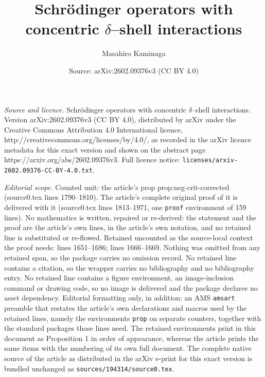 \documentclass[10pt,a4paper]{amsart}
\title{Schr\"odinger operators with concentric $\delta$--shell interactions}
\author{Masahiro Kaminaga}
\date{Source: arXiv:2602.09376v3 (CC BY 4.0)}
\begin{document}
\maketitle

\noindent\emph{Source and licence.} Schr\"odinger operators with concentric $\delta$--shell interactions. Version arXiv:2602.09376v3 (CC BY 4.0), distributed by arXiv under the Creative Commons Attribution 4.0 International licence, http://creativecommons.org/licenses/by/4.0/, as recorded in the arXiv licence metadata for this exact version and shown on the abstract page https://arxiv.org/abs/2602.09376v3. Full licence notice: \texttt{licenses/arxiv-2602.09376-CC-BY-4.0.txt}.\par\smallskip

\noindent\textit{Editorial scope.} Counted unit: the article's prop prop:neg-crit-corrected (source0.tex lines 1790--1810). The article's complete original proof of it is delivered with it (source0.tex lines 1813--1971, one \texttt{proof} environment of 159 lines). No mathematics is written, repaired or re-derived: the statement and the proof are the article's own lines, in the article's own notation, and no retained line is substituted or re-flowed.  Retained uncounted as the source-local context the proof needs: lines 1651--1686; lines 1666--1669.  Nothing was omitted from any retained span, so the package carries no omission record.  No retained line contains a citation, so the wrapper carries no bibliography and no bibliography entry.  No retained line contains a figure environment, an image-inclusion command or drawing code, so no image is delivered and the package declares no asset dependency.  Editorial formatting only, in addition: an AMS \texttt{amsart} preamble that restates the article's own declarations and macros used by the retained lines, namely the environments \texttt{prop} on separate counters, together with the standard packages those lines need.  The retained environments print in this document as Proposition 1 in order of appearance, whereas the article prints the same items with the numbering of its own full document.  The complete native source of the article as distributed in the arXiv e-print for this exact version is bundled unchanged as \texttt{sources/194314/source0.tex}.
\end{document}

